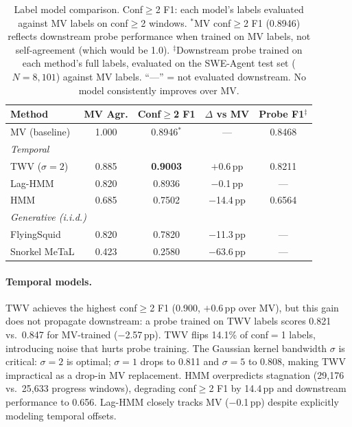 \begin{table}[h]
\centering
\small
\begin{tabular}{lcccc}
\toprule
\textbf{Method} & \textbf{MV Agr.} & \textbf{Conf${\geq}$2 F1} & \textbf{$\Delta$ vs MV} & \textbf{Probe F1$^\ddagger$} \\
\midrule
MV (baseline) & 1.000 & 0.8946$^\ast$ & --- & 0.8468 \\
\midrule
\multicolumn{5}{l}{\emph{Temporal}} \\
TWV ($\sigma{=}2$) & 0.885 & \textbf{0.9003} & $+$0.6\,pp & 0.8211 \\
Lag-HMM & 0.820 & 0.8936 & $-$0.1\,pp & --- \\
HMM & 0.685 & 0.7502 & $-$14.4\,pp & 0.6564 \\
\midrule
\multicolumn{5}{l}{\emph{Generative (i.i.d.)}} \\
FlyingSquid & 0.820 & 0.7820 & $-$11.3\,pp & --- \\
Snorkel MeTaL & 0.423 & 0.2580 & $-$63.6\,pp & --- \\
\bottomrule
\end{tabular}
\caption{Label model comparison. Conf${\geq}$2 F1: each model's labels evaluated against MV labels on conf${\geq}$2 windows. $^\ast$MV conf${\geq}$2 F1 (0.8946) reflects downstream probe performance when trained on MV labels, not self-agreement (which would be 1.0). $^\ddagger$Downstream probe trained on each method's full labels, evaluated on the SWE-Agent test set ($N{=}8{,}101$) against MV labels. ``---'' = not evaluated downstream. No model consistently improves over MV.}
\label{tab:temporal_models}
\end{table}

\paragraph{Temporal models.}
TWV achieves the highest conf${\geq}$2 F1 (0.900, $+$0.6\,pp over MV), but this gain does not propagate downstream: a probe trained on TWV labels scores 0.821 vs.\ 0.847 for MV-trained ($-$2.57\,pp).
TWV flips 14.1\% of conf${=}$1 labels, introducing noise that hurts probe training.
The Gaussian kernel bandwidth $\sigma$ is critical: $\sigma{=}2$ is optimal; $\sigma{=}1$ drops to 0.811 and $\sigma{=}5$ to 0.808, making TWV impractical as a drop-in MV replacement.
HMM overpredicts stagnation (29,176 vs.\ 25,633 progress windows), degrading conf${\geq}$2 F1 by 14.4\,pp and downstream performance to 0.656.
Lag-HMM closely tracks MV ($-$0.1\,pp) despite explicitly modeling temporal offsets.

